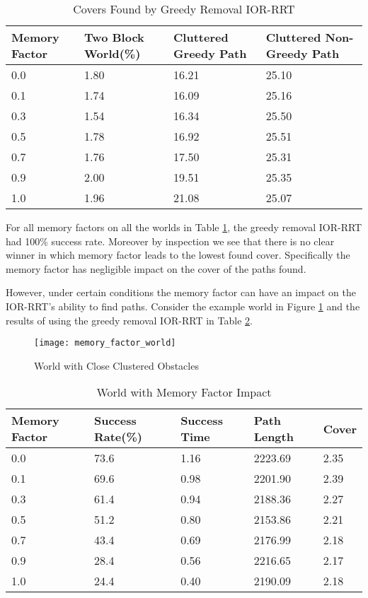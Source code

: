\begin{table}[h!]
\centering
\begin{tabular}{@{}llll@{}}
\toprule
Memory Factor & Two Block World(\%)  & Cluttered Greedy Path  & Cluttered Non-Greedy Path \\ 
\midrule
0.0 & 1.80 & 16.21 & 25.10 \\
0.1 & 1.74 & 16.09 & 25.16 \\
0.3 & 1.54 & 16.34 & 25.50 \\
0.5 & 1.78 & 16.92 & 25.51 \\
0.7 & 1.76 & 17.50 & 25.31 \\
0.9 & 2.00 & 19.51 & 25.35 \\ 
1.0 & 1.96 & 21.08 & 25.07 \\
\bottomrule
\end{tabular}
\caption{Covers Found by Greedy Removal IOR-RRT}
\label{tab:memory_factor_no_impact}
\end{table}

For all memory factors on all the worlds in Table \ref{tab:memory_factor_no_impact}, the greedy removal IOR-RRT had 100\% success rate. Moreover by inspection we see that there is no clear winner in which memory factor leads to the lowest found cover. Specifically the memory factor has negligible impact on the cover of the paths found. 

However, under certain conditions the memory factor can have an impact on the IOR-RRT's ability to find paths. Consider the example world in Figure \ref{fig:memory_factor_world} and the results of using the greedy removal IOR-RRT in Table \ref{tab:memory_factor_impact}.


\begin{figure}[h!]
    \centering
    \texttt{[image: memory\_factor\_world]}
    \caption{World with Close Clustered Obstacles}
    \label{fig:memory_factor_world}
\end{figure}

\begin{table}[h!]
\centering
\begin{tabular}{@{}lllll@{}}
\toprule
Memory Factor & Success Rate(\%)  & Success Time & Path Length & Cover \\ 
\midrule
0.0 & 73.6 & 1.16 & 2223.69 & 2.35 \\
0.1 & 69.6 & 0.98 & 2201.90 & 2.39 \\
0.3 & 61.4 & 0.94 & 2188.36 & 2.27 \\
0.5 & 51.2 & 0.80 & 2153.86 & 2.21 \\
0.7 & 43.4 & 0.69 & 2176.99 & 2.18 \\
0.9 & 28.4 & 0.56 & 2216.65 & 2.17 \\ 
1.0 & 24.4 & 0.40 & 2190.09 & 2.18 \\
\bottomrule
\end{tabular}
\caption{World with Memory Factor Impact}
\label{tab:memory_factor_impact}
\end{table}

